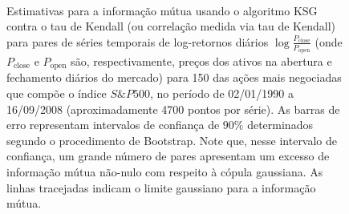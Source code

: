 \begin{figure}
\\	
\caption[Estimativas para a informação mútua \textit{vs.} tau de Kendall para séries financeiras.]{Estimativas para a informação mútua usando o algoritmo KSG contra o tau de Kendall (ou correlação medida via tau de Kendall) para pares de séries temporais de log-retornos diários $\log\frac{P_\text{close}}{P_\text{open}}$ (onde $P_\text{close}$ e $P_\text{open}$ são, respectivamente, preços dos ativos na abertura e fechamento diários do mercado) para 150 das ações mais negociadas que compõe o índice $S\&P500$, no período de 02/01/1990 a 16/09/2008 (aproximadamente 4700 pontos por série). As barras de erro representam intervalos de confiança de $90\%$ determinados segundo o procedimento de Bootstrap. Note que, nesse intervalo de confiança, um grande número de pares apresentam um excesso de informação mútua não-nulo com respeito à cópula gaussiana. As linhas tracejadas indicam o limite gaussiano para a informação mútua.}
\label{fig:acoes}
\end{figure}
